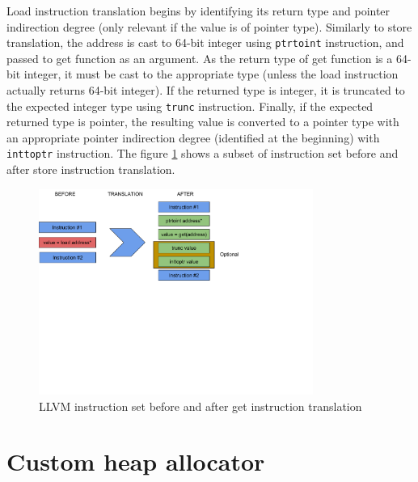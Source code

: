 \documentclass[bsc,frontabs,twoside,singlespacing,parskip,deptreport]{infthesis}     %
\begin{document}
Load instruction translation begins by identifying its return type and pointer indirection degree (only relevant if the value is of pointer type). Similarly to store translation, the address is cast to 64-bit integer using \texttt{ptrtoint} instruction, and passed to get function as an argument. As the return type of get function is a 64-bit integer, it must be cast to the appropriate type (unless the load instruction actually returns 64-bit integer). If the returned type is integer, it is truncated to the expected integer type using \texttt{trunc} instruction. Finally, if the expected returned type is pointer, the resulting value is converted to a pointer type with an appropriate pointer indirection degree (identified at the beginning) with \texttt{inttoptr} instruction. The figure \ref{fig:load_translation} shows a subset of instruction set before and after store instruction translation.

\begin{figure}[H]
\centering
\includegraphics[width=0.8\textwidth]{images/load_translation}
\caption{LLVM instruction set before and after get instruction translation}
\label{fig:load_translation}
\end{figure}
















\chapter{Custom heap allocator}
\end{document}
